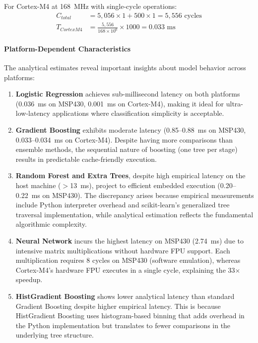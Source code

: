 For Cortex-M4 at 168~MHz with single-cycle operations:
\begin{align}
    C_{total} &= 5,056 \times 1 + 500 \times 1 = 5,556 \text{ cycles} \\
    T_{CortexM4} &= \frac{5,556}{168 \times 10^6} \times 1000 = 0.033 \text{ ms}
\end{align}

\paragraph{Platform-Dependent Characteristics}
The analytical estimates reveal important insights about model behavior across platforms:

\begin{enumerate}
    \item \textbf{Logistic Regression} achieves sub-millisecond latency on both platforms (0.036~ms on MSP430, 0.001~ms on Cortex-M4), making it ideal for ultra-low-latency applications where classification simplicity is acceptable.
    
    \item \textbf{Gradient Boosting} exhibits moderate latency (0.85--0.88~ms on MSP430, 0.033--0.034~ms on Cortex-M4). Despite having more comparisons than ensemble methods, the sequential nature of boosting (one tree per stage) results in predictable cache-friendly execution.
    
    \item \textbf{Random Forest and Extra Trees}, despite high empirical latency on the host machine ($>$13~ms), project to efficient embedded execution (0.20--0.22~ms on MSP430). The discrepancy arises because empirical measurements include Python interpreter overhead and scikit-learn's generalized tree traversal implementation, while analytical estimation reflects the fundamental algorithmic complexity.
    
    \item \textbf{Neural Network} incurs the highest latency on MSP430 (2.74~ms) due to intensive matrix multiplications without hardware FPU support. Each multiplication requires 8 cycles on MSP430 (software emulation), whereas Cortex-M4's hardware FPU executes in a single cycle, explaining the 33$\times$ speedup.
    
    \item \textbf{HistGradient Boosting} shows lower analytical latency than standard Gradient Boosting despite higher empirical latency. This is because HistGradient Boosting uses histogram-based binning that adds overhead in the Python implementation but translates to fewer comparisons in the underlying tree structure.
\end{enumerate}

